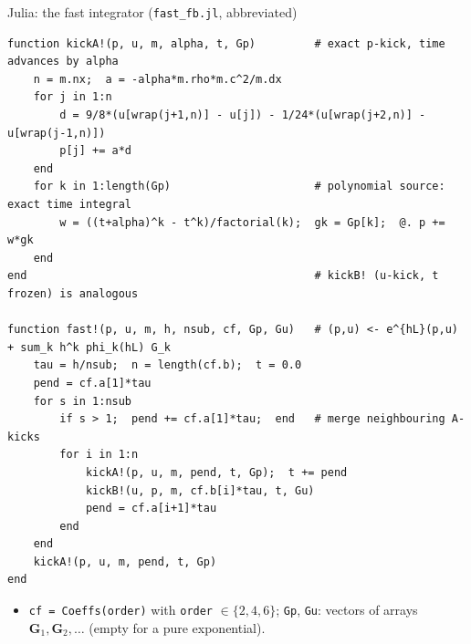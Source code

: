 \documentclass[aspectratio=169,10pt]{beamer}
\begin{document}
\begin{frame}[fragile]{Julia: the fast integrator (\texttt{fast\_fb.jl}, abbreviated)}
\begin{lstlisting}
function kickA!(p, u, m, alpha, t, Gp)         # exact p-kick, time advances by alpha
    n = m.nx;  a = -alpha*m.rho*m.c^2/m.dx
    for j in 1:n
        d = 9/8*(u[wrap(j+1,n)] - u[j]) - 1/24*(u[wrap(j+2,n)] - u[wrap(j-1,n)])
        p[j] += a*d
    end
    for k in 1:length(Gp)                      # polynomial source: exact time integral
        w = ((t+alpha)^k - t^k)/factorial(k);  gk = Gp[k];  @. p += w*gk
    end
end                                            # kickB! (u-kick, t frozen) is analogous

function fast!(p, u, m, h, nsub, cf, Gp, Gu)   # (p,u) <- e^{hL}(p,u) + sum_k h^k phi_k(hL) G_k
    tau = h/nsub;  n = length(cf.b);  t = 0.0
    pend = cf.a[1]*tau
    for s in 1:nsub
        if s > 1;  pend += cf.a[1]*tau;  end   # merge neighbouring A-kicks
        for i in 1:n
            kickA!(p, u, m, pend, t, Gp);  t += pend
            kickB!(u, p, m, cf.b[i]*tau, t, Gu)
            pend = cf.a[i+1]*tau
        end
    end
    kickA!(p, u, m, pend, t, Gp)
end
\end{lstlisting}
  \vspace{-0.3em}
  \begin{itemize}\footnotesize
    \item \texttt{cf = Coeffs(order)} with \texttt{order} $\in\{2,4,6\}$; \texttt{Gp}, \texttt{Gu}: vectors of arrays $\mathbf G_1,\mathbf G_2,\dots$ (empty for a pure exponential).
  \end{itemize}
\end{frame}
\end{document}
